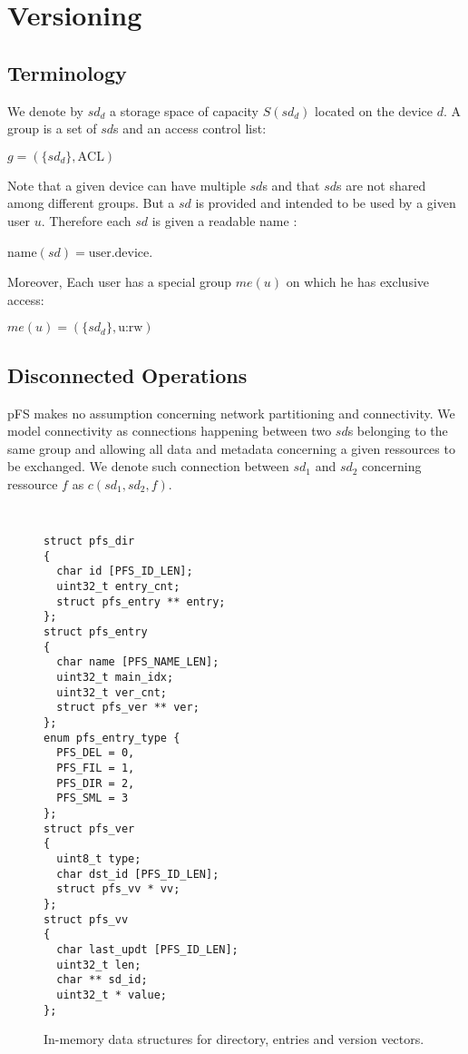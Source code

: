 
\section{Versioning}
\label{sec:vers}

\subsection{Terminology}

We denote by $sd_{d}$ a storage space of capacity $S(sd_{d})$
located on the device $d$. A group is a set of $sd$s and an
access control list:
\begin{center}
$g = (\{sd_{d}\}, \text{ACL})$
\end{center}
Note that a given device can have multiple $sd$s and that $sd$s are
not shared among different groups. But a $sd$ is provided and intended
to be used by a given user $u$. Therefore each $sd$ is given a
readable name :
\begin{center}
$\text{name}(sd) = \text{user}.\text{device}$. 
\end{center}
Moreover, Each user has a special group $me(u)$ on which he has
exclusive access:
\begin{center}
$me(u) = (\{sd_{d}\}, \text{u:rw})$
\end{center}

\subsection{Disconnected Operations}

pFS makes no assumption concerning network partitioning and
connectivity. We model connectivity as connections happening between
two $sd$s belonging to the same group and allowing all data and
metadata concerning a given ressources to be exchanged. We denote such
connection between $sd_{1}$ and $sd_{2}$ concerning ressource $f$ as
$c(sd_{1}, sd_{2}, f)$.

\begin{figure}[t]
\begin{center}
{\tt \small
\begin{verbatim}
struct pfs_dir
{
  char id [PFS_ID_LEN];
  uint32_t entry_cnt;
  struct pfs_entry ** entry;
};
struct pfs_entry
{
  char name [PFS_NAME_LEN];
  uint32_t main_idx;
  uint32_t ver_cnt; 
  struct pfs_ver ** ver;
};
enum pfs_entry_type {
  PFS_DEL = 0,
  PFS_FIL = 1,
  PFS_DIR = 2,
  PFS_SML = 3 
};
struct pfs_ver
{
  uint8_t type;
  char dst_id [PFS_ID_LEN];
  struct pfs_vv * vv;
};
struct pfs_vv
{ 
  char last_updt [PFS_ID_LEN];
  uint32_t len;
  char ** sd_id;
  uint32_t * value;
};
\end{verbatim}
}
\end{center}
\caption{\label{MemStruct}
{\small In-memory data structures for directory, entries and version
  vectors.}}
\end{figure}

